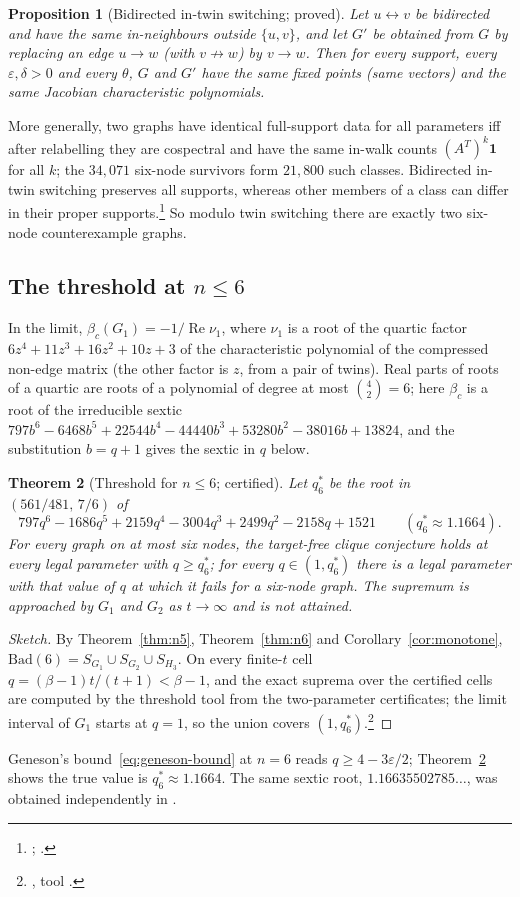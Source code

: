\documentclass[11pt]{article}
\newtheorem{theorem}{Theorem}[section]
\newtheorem{proposition}[theorem]{Proposition}
\theoremstyle{definition}
\newcommand{\one}{\mathbf{1}}
\newcommand{\eps}{\varepsilon}
\newcommand{\Rea}{\operatorname{Re}}
\begin{document}
\begin{proposition}[Bidirected in-twin switching; proved]\label{prop:J4}
Let $u\leftrightarrow v$ be bidirected and have the same in-neighbours outside $\{u,v\}$, and let $G'$ be obtained from $G$
by replacing an edge $u\to w$ (with $v\not\to w$) by $v\to w$. Then for every support, every $\eps,\delta>0$ and every
$\theta$, $G$ and $G'$ have the same fixed points (same vectors) and the same Jacobian characteristic polynomials.
\end{proposition}
More generally, two graphs have identical full-support data for all parameters iff after relabelling they are cospectral
and have the same in-walk counts $(A^T)^k\one$ for all $k$; the $34{,}071$ six-node survivors form $21{,}800$ such classes.
Bidirected in-twin switching preserves all supports, whereas other members of a class can differ in their proper
supports.\footnote{; .}
So modulo twin switching there are exactly two six-node counterexample graphs.

\subsection{The threshold at \texorpdfstring{$n\le6$}{n <= 6}}
In the limit, $\beta_c(G_1)=-1/\Rea\nu_1$, where $\nu_1$ is a root of the quartic factor $6z^4+11z^3+16z^2+10z+3$ of the
characteristic polynomial of the compressed non-edge matrix (the other factor is $z$, from a pair of twins). Real parts of
roots of a quartic are roots of a polynomial of degree at most $\binom42=6$; here $\beta_c$ is a root of the irreducible sextic
$797b^6-6468b^5+22544b^4-44440b^3+53280b^2-38016b+13824$, and the substitution $b=q+1$ gives the sextic in $q$ below.

\begin{theorem}[Threshold for $n\le6$; certified]\label{thm:q6}
Let $q_6^*$ be the root in $(561/481,\,7/6)$ of
\[
797q^6-1686q^5+2159q^4-3004q^3+2499q^2-2158q+1521\qquad(q_6^*\approx1.1664).
\]
For every graph on at most six nodes, the target-free clique conjecture holds at every legal parameter with
$q\ge q_6^*$; for every $q\in(1,q_6^*)$ there is a legal parameter with that value of $q$ at which it fails for a six-node
graph. The supremum is approached by $G_1$ and $G_2$ as $t\to\infty$ and is not attained.
\end{theorem}
\begin{proof}[Sketch]
By Theorem~\ref{thm:n5}, Theorem~\ref{thm:n6} and Corollary~\ref{cor:monotone}, $\mathrm{Bad}(6)=S_{G_1}\cup S_{G_2}\cup S_{H_3}$. On every
finite-$t$ cell $q=(\beta-1)t/(t+1)<\beta-1$, and the exact suprema over the certified cells are computed by the
threshold tool from the two-parameter certificates; the limit interval of $G_1$ starts at $q=1$, so the union covers
$(1,q_6^*)$.\footnote{, tool .}
\end{proof}
Geneson's bound~\eqref{eq:geneson-bound} at $n=6$ reads $q\ge4-3\eps/2$; Theorem~\ref{thm:q6} shows the true value is
$q_6^*\approx1.1664$. The same sextic root, $1.16635502785\ldots$, was obtained independently in \cite{SixIsMinimal2026}.
\end{document}
